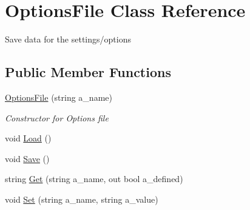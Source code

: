 \hypertarget{class_options_file}{}\section{Options\+File Class Reference}
\label{class_options_file}


Save data for the settings/options ~\newline
 


\subsection*{Public Member Functions}
\begin{DoxyCompactItemize}
\item 
\mbox{\hyperlink{class_options_file_a2491b9fc88bdd86d876bdd7797fbed72}{Options\+File}} (string a\+\_\+name)
\begin{DoxyCompactList}\small\item\em Constructor for Options file \end{DoxyCompactList}\item 
void \mbox{\hyperlink{class_options_file_abdab0a1c6e374b7fde7967ceb8ec13b6}{Load}} ()
\item 
void \mbox{\hyperlink{class_options_file_aa163cc656b4a308fe79102a20dcc0fef}{Save}} ()
\item 
string \mbox{\hyperlink{class_options_file_a13132f95a77c7e853049e4a171070c98}{Get}} (string a\+\_\+name, out bool a\+\_\+defined)
\item 
void \mbox{\hyperlink{class_options_file_a443990c9593d5856b6c5b6f6bec9e9dd}{Set}} (string a\+\_\+name, string a\+\_\+value)
\end{DoxyCompactItemize}

